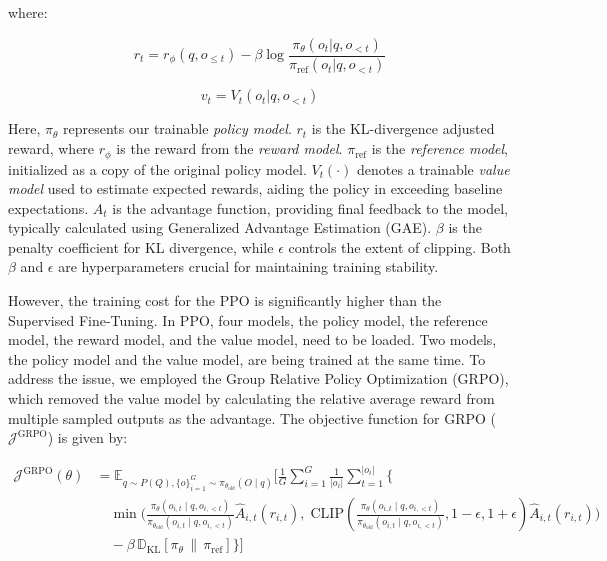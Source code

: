 where:

\begin{equation*}
r_t = r_\phi(q, o_{\leq t}) - \beta \log\frac{\pi_{\theta}(o_t | q, o_{<t})}{\pi_{\text{ref}}(o_t | q, o_{<t})}
\end{equation*}

\begin{equation*}
v_t = V_t(o_t | q, o_{<t})
\end{equation*}

Here, $\pi_{\theta}$ represents our trainable \textit{policy model}. $r_t$ is the KL-divergence adjusted reward, where $r_\phi$ is the reward from the \textit{reward model}. $\pi_{\text{ref}}$ is the \textit{reference model}, initialized as a copy of the original policy model. $V_t(\cdot)$ denotes a trainable \textit{value model} used to estimate expected rewards, aiding the policy in exceeding baseline expectations. $A_t$ is the advantage function, providing final feedback to the model, typically calculated using Generalized Advantage Estimation (GAE). $\beta$ is the penalty coefficient for KL divergence, while $\epsilon$ controls the extent of clipping. Both $\beta$ and $\epsilon$ are hyperparameters crucial for maintaining training stability.

However, the training cost for the PPO is significantly higher than the Supervised Fine-Tuning. In PPO, four models, the policy model, the reference model, the reward model, and the value model, need to be loaded. Two models, the policy model and the value model, are being trained at the same time. To address the issue, we employed the Group Relative Policy Optimization (GRPO), which removed the value model by calculating the relative average reward from multiple sampled outputs as the advantage. The objective function for GRPO ($\mathcal{J}^{\text{GRPO}}$) is given by:




\begin{footnotesize}
    \begin{equation}
        \begin{split}
            \mathcal{J}^{\text{GRPO}}(\theta) 
            &= \mathbb{E}_{q \sim P(Q), \{o\}^G_{i=1} \sim \pi_{\theta_{\text{old}}}(O \mid q)} \Bigg[ \frac{1}{G} \sum_{i=1}^{G} \frac{1}{|o_i|} \sum_{t=1}^{|o_i|} \Bigg\{ \nonumber \\
            &\quad \min \Bigg( 
                \frac{ \pi_{\theta}(o_{i,t} \mid q, o_{i,<t}) }{ \pi_{\theta_{\text{old}}}(o_{i,t} \mid q, o_{i,<t}) } \hat{A}_{i,t}(r_{i,t}), \;
                \text{CLIP}\left( \frac{ \pi_{\theta}(o_{i,t} \mid q, o_{i,<t}) }{ \pi_{\theta_{\text{old}}}(o_{i,t} \mid q, o_{i,<t}) }, 1 - \epsilon, 1 + \epsilon \right) \hat{A}_{i,t}(r_{i,t}) 
            \Bigg) \nonumber \\
            &\quad - \beta \, \mathbb{D}_{\text{KL}}\left[ \pi_{\theta} \,\|\, \pi_{\text{ref}} \right] 
            \Bigg\} \Bigg]
        \end{split}
    \end{equation}
\end{footnotesize}




